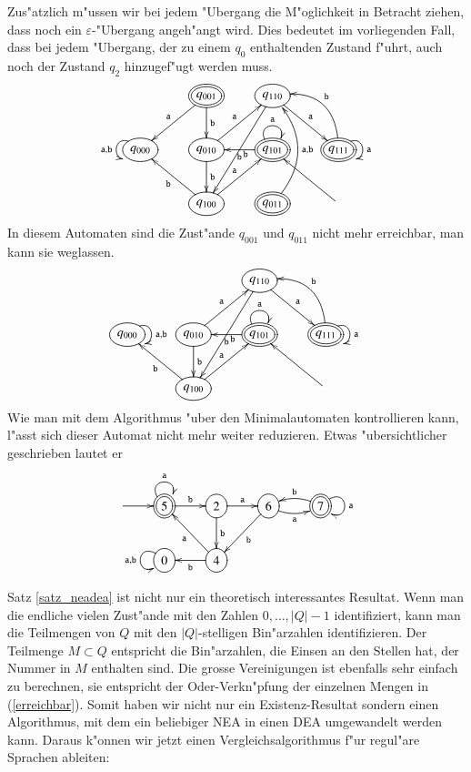 Zus"atzlich m"ussen wir bei jedem "Ubergang die M"oglichkeit in
Betracht ziehen, dass noch ein $\varepsilon$-"Ubergang angeh"angt
wird. Dies bedeutet im vorliegenden Fall, dass bei jedem "Ubergang,
der zu einem $q_0$ enthaltenden Zustand f"uhrt, auch noch der
Zustand $q_2$ hinzugef"ugt werden muss.
\[
\entrymodifiers={++[o][F]}
\xymatrix{
*+\txt{}
	&*++[o][F=]{q_{001}} \ar[d]^{\tt b}\ar[dl]_{\tt a}
		&{q_{110}}\ar[dr]^{\tt a} \ar[ddl]^{\tt b}
\\
{q_{000}}\ar@(ul,dl)_{{\tt a},{\tt b}}
	&{q_{010}} \ar[ur]^{\tt a} \ar[d]^{\tt b}
		&*++[o][F=]{q_{101}} \ar@(ul,ur)^{\tt a} \ar[l]^{\tt b}
			&*++[o][F=]{q_{111}}\ar@(ur,dr)^{{\tt a}} \ar@/_20pt/[ul]_{\tt b}
\\
*+\txt{}
	&{q_{100}}\ar[ur]^{\tt a} \ar[ul]^{\tt b}
		&*++[o][F=]{q_{011}} \ar@/_20pt/[uu]_{{\tt a},{\tt b}}
			&*+\txt{}\ar[ul]
}
\]
In diesem Automaten sind die Zust"ande $q_{001}$ und $q_{011}$ nicht
mehr erreichbar, man kann sie weglassen.
\[
\entrymodifiers={++[o][F]}
\xymatrix{
*+\txt{}
	&*+\txt{}
		&{q_{110}}\ar[dr]^{\tt a} \ar[ddl]^{\tt b}
\\
{q_{000}}\ar@(ur,dr)^{{\tt a},{\tt b}}
	&{q_{010}} \ar[ur]^{\tt a} \ar[d]^{\tt b}
		&*++[o][F=]{q_{101}} \ar@(ul,ur)^{\tt a} \ar[l]^{\tt b}
			&*++[o][F=]{q_{111}}\ar@(ur,dr)^{{\tt a}} \ar@/_20pt/[ul]_{\tt b}
\\
*+\txt{}
	&{q_{100}}\ar[ur]^{\tt a} \ar[ul]^{\tt b}
		&*+\txt{}
			&*+\txt{}\ar[ul]
}
\]
Wie man mit dem Algorithmus "uber den Minimalautomaten kontrollieren
kann, l"asst sich dieser Automat nicht mehr weiter reduzieren. Etwas
"ubersichtlicher geschrieben lautet er
\[
\entrymodifiers={++[o][F]}
\xymatrix{
*+\txt{}\ar[r]
	&*++[o][F=]{5}\ar@(ul,ur)^{\tt a} \ar[r]^{\tt b}
		&2\ar[r]^{\tt a} \ar[d]^{\tt b}
			&6\ar@/_/[r]_{\tt a} \ar[dl]^{\tt b}
				&*++[o][F=]{7}\ar@/_/[l]_{\tt b} \ar@(ur,dr)^{\tt a}
\\
*+\txt{}
	&0\ar@(ul,dl)_{{\tt a},{\tt b}}
		&4\ar[ul]^{\tt a} \ar[l]^{\tt b}
}
\]


Satz \ref{satz_neadea} ist nicht nur ein theoretisch interessantes
Resultat. Wenn man die endliche vielen Zust"ande mit den Zahlen
$0,\dots,|Q|-1$ identifiziert, kann man die Teilmengen von $Q$ mit
den $|Q|$-stelligen Bin"arzahlen identifizieren.
Der Teilmenge $M\subset Q$ entspricht die Bin"arzahlen, die Einsen an
den Stellen hat, der Nummer
in $M$ enthalten sind.
Die grosse Vereinigungen ist ebenfalls sehr einfach
zu berechnen, sie entspricht der Oder-Verkn"pfung
der einzelnen Mengen in (\ref{erreichbar}).
Somit haben wir nicht nur ein Existenz-Resultat sondern einen
Algorithmus, mit dem ein beliebiger NEA in einen DEA umgewandelt
werden kann.
Daraus k"onnen wir jetzt einen Vergleichsalgorithmus f"ur regul"are
Sprachen ableiten: 


